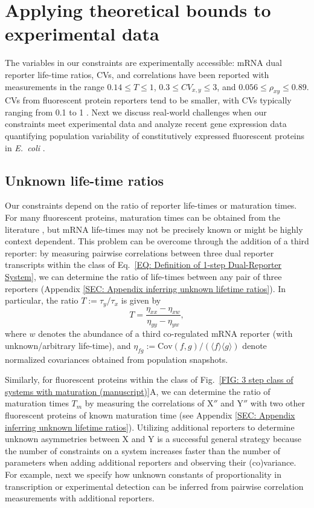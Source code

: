 \documentclass[%
 reprint,prx,
superscriptaddress,
%
%
%
%
%
%
%
%
%
 amsmath,amssymb,
 aps,
%
%
%
%
%
%
]{revtex4-2}
\newcommand{\lb}{\langle}
\newcommand{\rb}{\rangle}
\begin{document}
\section{Applying theoretical bounds to experimental data}
\vspace{-1em}
\label{SEC: Practical Applicability}
{
The variables in our constraints are experimentally accessible: mRNA dual reporter life-time ratios, CVs, and correlations have been reported \cite{baudrimont2019contribution, raj2006stochastic} with measurements in the range $0.14 \leq T \leq 1$, $0.3 \leq CV_{x,y} \leq 3$, and $0.056 \leq \rho_{xy} \leq 0.89$. CVs from fluorescent protein reporters tend to be smaller, with CVs typically ranging from 0.1 to 1 \cite{Raser2004, Bar-Even2006, Elowitz2002}. Next we discuss real-world challenges when our constraints meet experimental data and analyze recent gene expression data quantifying population variability of constitutively expressed fluorescent proteins in \emph{E.~coli} \cite{Balleza2018}.
}
\vspace{-.5em}
\subsection{Unknown life-time ratios}\vspace{-.75em}
Our constraints depend on the ratio of reporter life-times or maturation times. For many fluorescent proteins, maturation times can be obtained from the literature \cite{Balleza2018}, but mRNA life-times may not be precisely known or might be highly context dependent. This problem can be overcome through the addition of a third reporter: by measuring pairwise correlations between three dual reporter transcripts within the class of Eq.~\eqref{EQ: Definition of 1-step Dual-Reporter System}, we can determine the ratio of life-times between any pair of three reporters (Appendix \ref{SEC: Appendix inferring unknown lifetime ratios}). In particular, the ratio $T:=\tau_y/\tau_x$ is given by 
 \begin{equation}
     T=\frac{\eta_{xx}-\eta_{xw}}{\eta_{yy}-\eta_{yw}},
     \label{EQ: T (manuscript)}
 \end{equation}
 where $w$ denotes the abundance of a third co-regulated mRNA reporter (with unknown/arbitrary life-time), {and \mbox{$\eta_{fg}:= \text{Cov}(f,g)/(\lb f \rb \lb g \rb)$} denote normalized covariances obtained from population snapshots.}

Similarly, for fluorescent proteins within the class of Fig.~\ref{FIG: 3 step class of systems with maturation (manuscript)}A, we can determine the ratio of maturation times $T_m$ by measuring the correlations of X$''$ and Y$''$ with two other fluorescent proteins of known maturation time (see Appendix \ref{SEC: Appendix inferring unknown lifetime ratios}). Utilizing additional reporters to determine unknown asymmetries between X and Y is a successful general strategy because the number of constraints on a system increases faster than the number of parameters when adding additional reporters and observing their (co)variance. For example, next we specify how unknown constants of proportionality in transcription or experimental detection can be inferred from pairwise correlation measurements with additional reporters.
\end{document}
